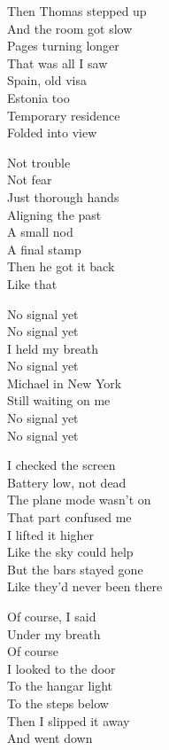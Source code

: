\begin{lyrics}
Then Thomas stepped up\\
And the room got slow\\
Pages turning longer\\
That was all I saw\\
Spain, old visa\\
Estonia too\\
Temporary residence\\
Folded into view

Not trouble\\
Not fear\\
Just thorough hands\\
Aligning the past\\
A small nod\\
A final stamp\\
Then he got it back\\
Like that

No signal yet\\
No signal yet\\
I held my breath\\
No signal yet\\
Michael in New York\\
Still waiting on me\\
No signal yet\\
No signal yet

I checked the screen\\
Battery low, not dead\\
The plane mode wasn’t on\\
That part confused me\\
I lifted it higher\\
Like the sky could help\\
But the bars stayed gone\\
Like they’d never been there

Of course, I said\\
Under my breath\\
Of course\\
I looked to the door\\
To the hangar light\\
To the steps below\\
Then I slipped it away\\
And went down
\end{lyrics}

